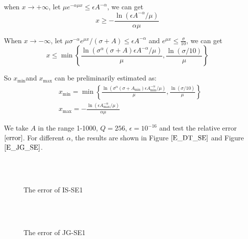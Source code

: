 when $x\rightarrow +\infty$, let $\mu e^{-\alpha \mu x}\leq \epsilon A^{-\alpha}$, we can get
\begin{equation}
x\geq -\frac{\ln(\epsilon A^{-\alpha}/\mu)}{\alpha \mu}
\end{equation}

When $x\rightarrow -\infty$, let $\mu \sigma^{-\alpha}e^{\mu x}/(\sigma+A)\leq \epsilon A^{-\alpha}$ and $e^{\mu x}\le \frac{\sigma}{10}$, we can get
\begin{equation}
x\leq \min\left\{\frac{\ln(\sigma^{\alpha}(\sigma+A)\epsilon A^{-\alpha}/\mu)}{\mu},\frac{\ln(\sigma/10)}{\mu}\right\}
\end{equation}

So  $x_{\min}$and $x_{\max}$ can be preliminarily estimated as:
\begin{equation}
\begin{aligned}
&x_{\min}=\min\left\{\frac{\ln(\sigma^{\alpha}(\sigma+A_{\min})\epsilon A_{\min}^{-\alpha}/\mu)}{\mu},\frac{\ln(\sigma/10)}{\mu}\right\}\\
&x_{\max}=-\frac{\ln(\epsilon A_{\max}^{-\alpha}/\mu)}{\alpha \mu}
\end{aligned}
\end{equation}


We take $A$ in the range 1-1000, $Q=256$,  $\epsilon=10^{-16}$ and test the relative error $\eqref{error}$. For different $\alpha $, the results are shown in Figure $\ref{E_DT_SE}$ and Figure $\ref{E_JG_SE}$.

\begin{figure}[htbp]
\centering
{}
~~
~~
\\
~~
~~
  \caption{The error of IS-SE1}
  \label{E_DT_SE}
\end{figure}


\begin{figure}[htbp]
\centering
{}
~~
~~
\\
~~
~~
  \caption{The error of JG-SE1}
  \label{E_JG_SE}
\end{figure}



